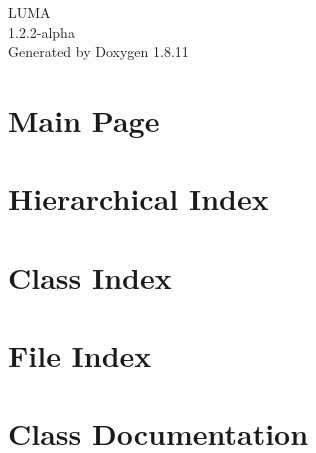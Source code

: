 \documentclass[twoside]{book}
\newcommand{\+}{\discretionary{\mbox{\scriptsize$\hookleftarrow$}}{}{}}
\newcommand{\clearemptydoublepage}{%
  \newpage{\pagestyle{empty}\cleardoublepage}%
}
\begin{document}
\hypersetup{pageanchor=false,
             bookmarksnumbered=true,
             pdfencoding=unicode
            }
\begin{titlepage}
\vspace*{7cm}
\begin{center}%
{\Large L\+U\+MA \\[1ex]\large 1.\+2.\+2-\/alpha }\\
\vspace*{1cm}
{\large Generated by Doxygen 1.8.11}\\
\end{center}
\end{titlepage}
\clearemptydoublepage
\tableofcontents
\clearemptydoublepage
{}
\hypersetup{pageanchor=true}

\chapter{Main Page}
\label{index}\hypertarget{index}{}
\chapter{Hierarchical Index}

\chapter{Class Index}

\chapter{File Index}

\chapter{Class Documentation}

















\end{document}
